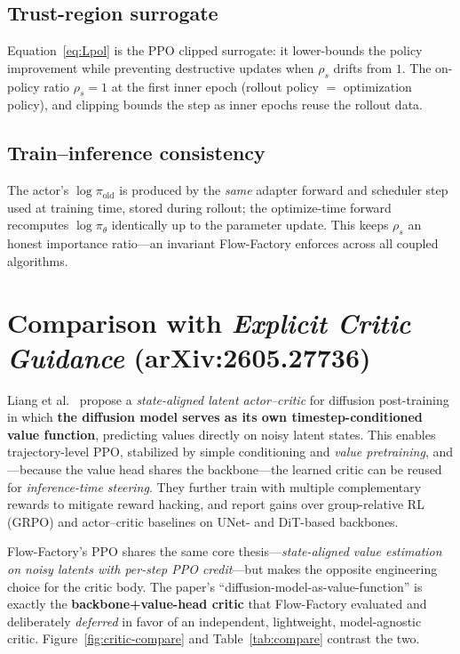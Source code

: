 \documentclass[11pt]{article}
\theoremstyle{plain}
\theoremstyle{remark}
\begin{document}
\subsection{Trust-region surrogate}
Equation~\eqref{eq:Lpol} is the PPO clipped surrogate: it lower-bounds the policy
improvement while preventing destructive updates when $\rho_s$ drifts from $1$. The
on-policy ratio $\rho_s=1$ at the first inner epoch (rollout policy $=$ optimization
policy), and clipping bounds the step as inner epochs reuse the rollout data.

\subsection{Train--inference consistency}
The actor's $\log\pi_{\mathrm{old}}$ is produced by the \emph{same} adapter forward and
scheduler step used at training time, stored during rollout; the optimize-time forward
recomputes $\log\pi_\theta$ identically up to the parameter update. This keeps
$\rho_s$ an honest importance ratio---an invariant Flow-Factory enforces across all
coupled algorithms.

\section{Comparison with \emph{Explicit Critic Guidance} (arXiv:2605.27736)}
\label{sec:compare}

Liang et al.~\cite{liang2026critic} propose a \emph{state-aligned latent actor--critic} for
diffusion post-training in which \textbf{the diffusion model serves as its own
timestep-conditioned value function}, predicting values directly on noisy latent
states. This enables trajectory-level PPO, stabilized by simple conditioning and
\emph{value pretraining}, and---because the value head shares the backbone---the
learned critic can be reused for \emph{inference-time steering}. They further train
with multiple complementary rewards to mitigate reward hacking, and report gains over
group-relative RL (GRPO) and actor--critic baselines on UNet- and DiT-based backbones.

Flow-Factory's PPO shares the same core thesis---\emph{state-aligned value estimation
on noisy latents with per-step PPO credit}---but makes the opposite engineering choice
for the critic body. The paper's ``diffusion-model-as-value-function'' is exactly the
\textbf{backbone+value-head critic} that Flow-Factory evaluated and deliberately
\emph{deferred} in favor of an independent, lightweight, model-agnostic critic.
Figure~\ref{fig:critic-compare} and Table~\ref{tab:compare} contrast the two.
\end{document}
